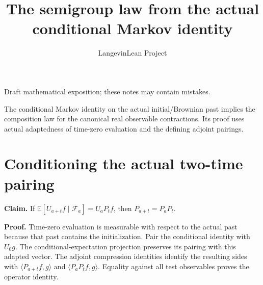 \documentclass[11pt,a4paper]{article}
\title{\texorpdfstring{The semigroup law from the actual conditional Markov identity}{The semigroup law from the actual conditional Markov identity}}
\author{LangevinLean Project}
\date{}
\begin{document}
\maketitle
Draft mathematical exposition; these notes may contain mistakes.


The conditional Markov identity on the actual initial/\allowbreak{}Brownian past implies the composition law for the canonical real observable contractions. Its proof uses actual adaptedness of time-zero evaluation and the defining adjoint pairings.


\section{\texorpdfstring{Conditioning the actual two-time pairing}{Conditioning the actual two-time pairing}}


\textbf{Claim.} If \(\mathbb E[U_{a+t}f\mid\mathcal F_a]=U_aP_tf\), then \(P_{a+t}=P_aP_t\).



\textbf{Proof.} Time-zero evaluation is measurable with respect to the actual past because that past contains the initialization. Pair the conditional identity with \(U_0g\). The conditional-expectation projection preserves its pairing with this adapted vector. The adjoint compression identities identify the resulting sides with \(\langle P_{a+t}f,g\rangle\) and \(\langle P_aP_tf,g\rangle\). Equality against all test observables proves the operator identity.
\end{document}
